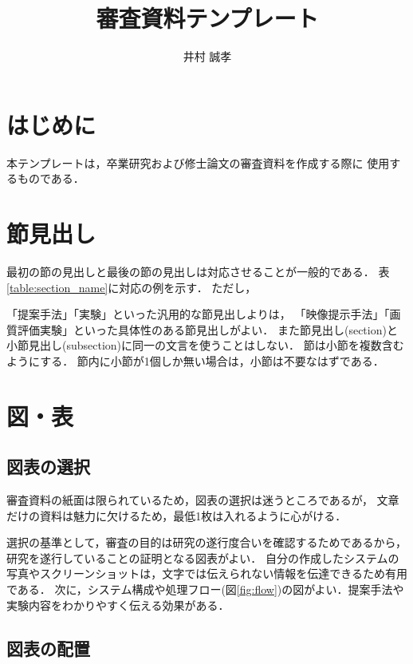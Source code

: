 \documentclass[paper=a4paper,fontsize=10pt,jafontscale=0.925,twocolumn]{jlreq}
\title{審査資料テンプレート} %
\affiliation{知能・機械工学課程 井村研究室} %
\author{井村 誠孝} %
\begin{document}
\maketitle

\section{はじめに}

本テンプレートは，卒業研究および修士論文の審査資料を作成する際に
使用するものである．

\section{節見出し}

最初の節の見出しと最後の節の見出しは対応させることが一般的である．
表\ref{table:section_name}に対応の例を示す．
ただし，

「提案手法」「実験」といった汎用的な節見出しよりは，
「映像提示手法」「画質評価実験」といった具体性のある節見出しがよい．
また節見出し(section)と小節見出し(subsection)に同一の文言を使うことはしない．
節は小節を複数含むようにする．
節内に小節が1個しか無い場合は，小節は不要なはずである．

\section{図・表}

\subsection{図表の選択}

審査資料の紙面は限られているため，図表の選択は迷うところであるが，
文章だけの資料は魅力に欠けるため，最低1枚は入れるように心がける．

選択の基準として，審査の目的は研究の遂行度合いを確認するためであるから，
研究を遂行していることの証明となる図表がよい．
自分の作成したシステムの写真やスクリーンショットは，文字では伝えられない情報を伝達できるため有用である．
次に，システム構成や処理フロー(図\ref{fig:flow})の図がよい．提案手法や実験内容をわかりやすく伝える効果がある．

\subsection{図表の配置}
\end{document}
